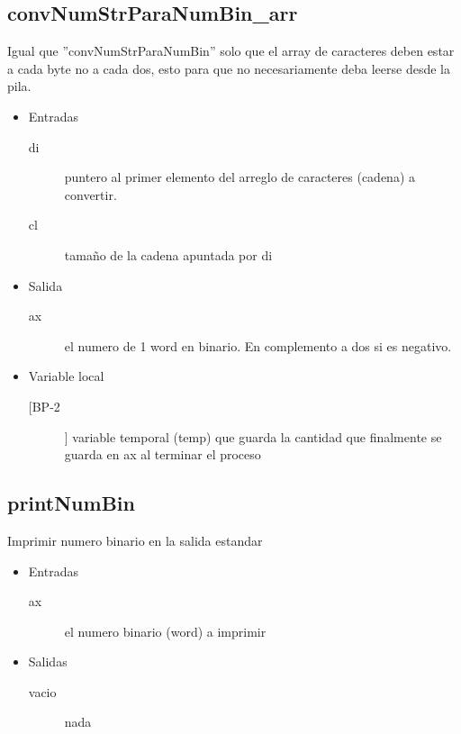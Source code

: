 \subsection{convNumStrParaNumBin\_arr}
\label{sec-2-5}
Igual que ''convNumStrParaNumBin'' solo que el array de caracteres deben
estar a cada byte no a cada dos, esto para que no necesariamente deba
leerse desde la pila.
\begin{itemize}
\item Entradas
\begin{description}
\item[di] puntero al primer elemento del arreglo de caracteres
(cadena) a convertir.
\item[cl] tamaño de la cadena apuntada por di
\end{description}

\item Salida
\begin{description}
\item[ax] el numero de 1 word en binario. En complemento a dos si es
negativo.
\end{description}

\item Variable local
\begin{description}
\item[[BP-2]] variable temporal (temp) que guarda la cantidad que
finalmente se guarda en ax al terminar el proceso
\end{description}
\end{itemize}

\subsection{printNumBin}
\label{sec-2-6}
Imprimir numero binario en la salida estandar
\begin{itemize}
\item Entradas
\begin{description}
\item[ax] el numero binario (word) a imprimir
\end{description}
\item Salidas
\begin{description}
\item[vacio] nada
\end{description}
\end{itemize}


